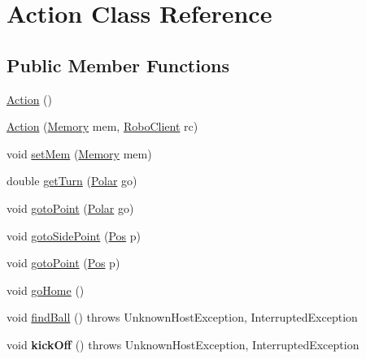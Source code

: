 \hypertarget{classAction}{
\section{Action Class Reference}
\label{classAction}
}
\subsection*{Public Member Functions}
\begin{DoxyCompactItemize}
\item 
\hyperlink{classAction_a4f457ccfc8336b565cadca56b36e0271}{Action} ()
\item 
\hyperlink{classAction_acfa1602ef29e16a6047cc058ff0a16ac}{Action} (\hyperlink{classMemory}{Memory} mem, \hyperlink{classRoboClient}{RoboClient} rc)
\item 
void \hyperlink{classAction_a4f775977b788d1379b9f6c45bb37c01f}{setMem} (\hyperlink{classMemory}{Memory} mem)
\item 
double \hyperlink{classAction_ad68c5200162e4023fb88488e340ea454}{getTurn} (\hyperlink{classPolar}{Polar} go)
\item 
void \hyperlink{classAction_a6b7099c20c56fc3dd72ce4c8ba4f3870}{gotoPoint} (\hyperlink{classPolar}{Polar} go)
\item 
void \hyperlink{classAction_a653bde47fe3bd4263ed31095e2ee1cfc}{gotoSidePoint} (\hyperlink{classPos}{Pos} p)
\item 
void \hyperlink{classAction_a5f7eb7be5b6b18854936367833044a6e}{gotoPoint} (\hyperlink{classPos}{Pos} p)
\item 
void \hyperlink{classAction_abf9085a62947a12cc2e154396177ec90}{goHome} ()
\item 
void \hyperlink{classAction_a49e1c7f1d7f5a4294c93833997603339}{findBall} ()  throws UnknownHostException, InterruptedException 
\item 
\hypertarget{classAction_a79224f655b7f92fe9a334bf96a01e844}{
void {\bfseries kickOff} ()  throws UnknownHostException, InterruptedException }
\label{classAction_a79224f655b7f92fe9a334bf96a01e844}


\end{DoxyCompactItemize}
